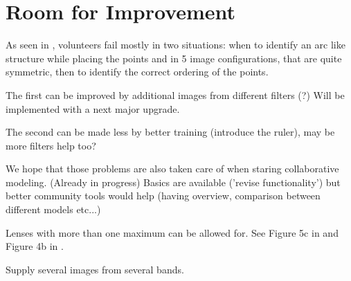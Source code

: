 \section{Room for Improvement} \label{sec:todo}

As seen in , volunteers fail mostly in two situations:
when to identify an arc like structure while placing the points
and in 5 image configurations, that are quite symmetric, then to identify the correct ordering of the points.

The first can be improved by additional images from different filters (?)
Will be implemented with a next major \spl upgrade.

The second can be made less by better training (introduce the ruler), may be more filters help too?

We hope that those problems are also taken care of when staring collaborative modeling. (Already in progress)
Basics are available ('revise functionality') but better community tools would help (having overview, comparison between different models etc...)

Lenses with more than one maximum can be allowed for.  See Figure 5c
in \citep{2001ApJ...557..594R} and Figure 4b in
\cite{2003ApJ...590...39K}.

Supply several images from several bands.

